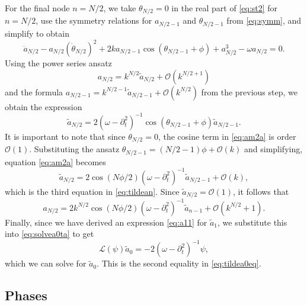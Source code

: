 \documentclass[11pt,reqno]{amsart}
\def\calL{{\mathcal L}}
\begin{document}
For the final node $n=N/2$, we take $\theta_{N/2} = 0$ in the real part of \cref{eq:st2} for $n = N/2$, use the symmetry relations for $a_{N/2-1}$ and $\theta_{N/2-1}$ from \cref{eq:symm}, and simplify to obtain
\[
\ddot a_{N/2} - a_{N/2} (\dot \theta_{N/2})^2 + 
2 k a_{N/2-1}\cos( \theta_{N/2-1} + \phi) + a_{N/2}^3 - \omega a_{N/2} = 0.
\]
Using the power series ansatz
\[
a_{N/2} = k^{N/2} \widetilde{a}_{N/2} + \mathcal{O}(k^{N/2+1})
\]
and the formula $a_{N/2-1} = k^{N/2-1} \widetilde{a}_{N/2-1} + \mathcal{O}(k^{N/2})$ from the previous step, we obtain the expression
\begin{equation}\label{eq:am2a}
\widetilde{a}_{N/2} = 2 (\omega - \partial_t^2)^{-1}\cos( \theta_{N/2-1} + \phi) \widetilde{a}_{N/2-1}.
\end{equation}
It is important to note that since $\theta_{N/2} = 0$, the cosine term in \cref{eq:am2a} is order $\mathcal{O}(1)$. Substituting the ansatz $\theta_{N/2-1} = (N/2-1)\phi + \mathcal{O}(k)$ and simplifying, equation \cref{eq:am2a} becomes
\begin{equation}\label{eq:am2}
\widetilde{a}_{N/2} = 2 \cos( N\phi/2)(\omega - \partial_t^2)^{-1} \widetilde{a}_{N/2-1} + \mathcal{O}(k),
\end{equation}
which is the third equation in \cref{eq:tildean}. Since $\widetilde{a}_{N/2} = \mathcal{O}(1)$, it follows that
\begin{equation}\label{eq:am2eq}
a_{N/2} = 2 k^{N/2} \cos\left( N\phi / 2\right) (\omega - \partial_t^2)^{-1} \widetilde{a}_{n-1} + \mathcal{O}(k^{N/2}+1).
\end{equation}
Finally, since we have derived an expression \cref{eq:a11} for $\widetilde{a}_1$, we substitute this into \cref{eq:solvea0ta} to get 
\[
\calL(\psi) \widetilde{a}_0 = -2 (\omega - \partial_t^2)^{-1} \psi,
\]
which we can solve for $\widetilde{a}_0$. This is the second equality in \cref{eq:tildea0eq}.

\subsection{Phases}
\end{document}
